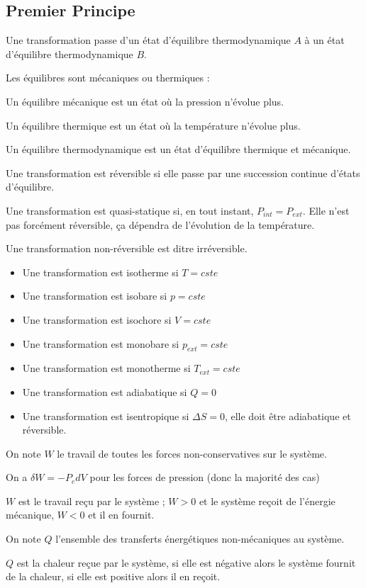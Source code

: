 \documentclass[a4paper,12pt]{book}
\newcommand{\Def}[2]{\begin{tcolorbox}[colback=white,colframe=red!10!green!20!blue!75!, title=Définition : #1]#2\end{tcolorbox}}
\begin{document}
\subsection{Premier Principe}
\Def{Transformation}{Une transformation passe d'un état d'équilibre thermodynamique $A$ à un état d'équilibre thermodynamique $B$.
\par Les équilibres sont mécaniques ou thermiques :
\par Un équilibre mécanique est un état où la pression n'évolue plus.
\par Un équilibre thermique est un état où la température n'évolue plus.
\par Un équilibre thermodynamique est un état d'équilibre thermique et mécanique.}
\Def{Réversibilité}{Une transformation est réversible si elle passe par une succession continue d'états d'équilibre.
\par Une transformation est quasi-statique si, en tout instant, $P_{int} =P_{ext}$. Elle n'est pas forcément réversible, ça dépendra de l'évolution de la température.
\par Une transformation non-réversible est ditre irréversible.}
\Def{Types de transformations}{\begin{itemize}
\item Une transformation est isotherme si $T=cste$
\item Une transformation est isobare si $p=cste$
\item Une transformation est isochore si $V =cste$
\item Une transformation est monobare si $p_{ext} =cste$
\item Une transformation est monotherme si $T_{ext}=cste$
\item Une transformation est adiabatique si $Q=0$
\item Une transformation est isentropique si $\Delta S = 0$, elle doit être adiabatique et réversible.
\end{itemize}}
\Def{Travail}{On note $W$ le travail de toutes les forces non-conservatives sur le système.
\par On a $\delta W = -P_edV$ pour les forces de pression (donc la majorité des cas)
\par $W$ est le travail reçu par le système ; $W>0$ et le système reçoit de l'énergie mécanique, $W<0$ et il en fournit.}
\Def{Chaleur}{On note $Q$ l'ensemble des transferts énergétiques non-mécaniques au système. 
\par $Q$ est la chaleur reçue par le système, si elle est négative alors le système fournit de la chaleur, si elle est positive alors il en reçoit.}
\end{document}
